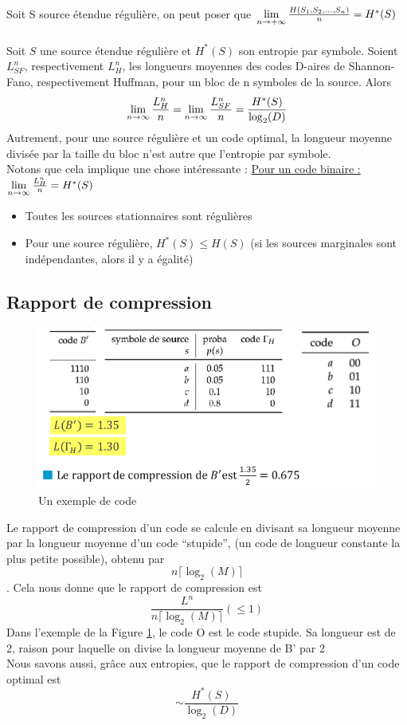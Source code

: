 \documentclass[11pt,a4paper]{article}
\renewcommand{\)}{\right)}
\renewcommand{\(}{\left(}
\begin{document}
\\
 Soit S source étendue régulière, on peut poser que $\lim\limits_{n\to +\infty}\frac{H(S_1,S_2,...,S_n)}{n} = H^*(S)$\\
\\
 Soit $S$ une source étendue régulière et $H^*(S)$ son entropie par symbole. Soient $L^n_{SF}$, respectivement $L^n_{H}$, les longueurs moyennes des codes D-aires de Shannon-Fano, respectivement Huffman, pour un bloc de n symboles de la source. Alors
\begin{equation*}
	\lim\limits_{n \to \infty} \frac{L_H^n}{n} = \lim\limits_{n \to \infty} \frac{L_{SF}^n}{n} = \frac{H^*(S)}{\log_2(D)}
\end{equation*}
Autrement, pour une source régulière et un code optimal, la longueur moyenne divisée par la taille du bloc n'est autre que l'entropie par symbole.\\
Notons que cela implique une chose intéressante : \uline{Pour un code binaire :} $\lim\limits_{n \to \infty} \frac{L_H^n}{n} = H^*(S)$\\
\begin{itemize}
	\item Toutes les sources stationnaires sont régulières
	\item {} Pour une source régulière, $H^*(S) \leq H(S)$ (si les sources marginales sont indépendantes, alors il y a égalité)
\end{itemize}

\subsection{Rapport de compression}
\begin{figure}
	\includegraphics[scale=0.5]{images/compression}
	\caption{Un exemple de code}
	\label{compression}
\end{figure}
Le rapport de compression d'un code se calcule en divisant sa longueur moyenne par la longueur moyenne d'un code \enquote{stupide}, (un code de longueur constante la plus petite possible), obtenu par \[n\lceil \log_2(M)\rceil\]. Cela nous donne que le rapport de compression est \[\frac{L^n}{n\lceil \log_2(M)\rceil} (\leq 1)\]
Dans l'exemple de la Figure \ref{compression}, le code O est le code stupide. Sa longueur est de 2, raison pour laquelle on divise la longueur moyenne de B' par 2\\
Nous savons aussi, grâce aux entropies, que le rapport de compression d'un code optimal est \[ \sim\frac{H^*(S)}{\log_2(D)}\]
\end{document}
